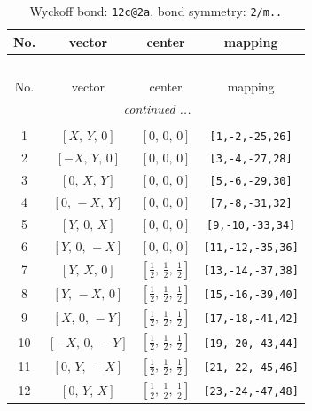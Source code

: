 \documentclass[fleqn,8pt]{jsarticle}
\begin{document}
\begin{longtable}{cccc}
\caption{Wyckoff bond: {\tt 12c@2a}, bond symmetry: {\tt 2/m..}}
 \\
 \hline \hline
No. & vector & center & mapping \\ \hline \endfirsthead

\multicolumn{3}{l}{\tablename\ \thetable{}} \\
 \hline \hline
No. & vector & center & mapping \\ \hline \endhead

 \hline \hline
\multicolumn{3}{r}{\footnotesize\it continued ...} \\ \endfoot

 \hline \hline
\multicolumn{3}{r}{} \\ \endlastfoot

1 & $\left[ X,\, Y,\, 0 \right]$ & $\left[ 0,\, 0,\, 0 \right]$ & {\tt [1,-2,-25,26]} \\ \hline
2 & $\left[ - X,\, Y,\, 0 \right]$ & $\left[ 0,\, 0,\, 0 \right]$ & {\tt [3,-4,-27,28]} \\ \hline
3 & $\left[ 0,\, X,\, Y \right]$ & $\left[ 0,\, 0,\, 0 \right]$ & {\tt [5,-6,-29,30]} \\ \hline
4 & $\left[ 0,\, - X,\, Y \right]$ & $\left[ 0,\, 0,\, 0 \right]$ & {\tt [7,-8,-31,32]} \\ \hline
5 & $\left[ Y,\, 0,\, X \right]$ & $\left[ 0,\, 0,\, 0 \right]$ & {\tt [9,-10,-33,34]} \\ \hline
6 & $\left[ Y,\, 0,\, - X \right]$ & $\left[ 0,\, 0,\, 0 \right]$ & {\tt [11,-12,-35,36]} \\ \hline
7 & $\left[ Y,\, X,\, 0 \right]$ & $\left[ \frac{1}{2},\, \frac{1}{2},\, \frac{1}{2} \right]$ & {\tt [13,-14,-37,38]} \\ \hline
8 & $\left[ Y,\, - X,\, 0 \right]$ & $\left[ \frac{1}{2},\, \frac{1}{2},\, \frac{1}{2} \right]$ & {\tt [15,-16,-39,40]} \\ \hline
9 & $\left[ X,\, 0,\, - Y \right]$ & $\left[ \frac{1}{2},\, \frac{1}{2},\, \frac{1}{2} \right]$ & {\tt [17,-18,-41,42]} \\ \hline
10 & $\left[ - X,\, 0,\, - Y \right]$ & $\left[ \frac{1}{2},\, \frac{1}{2},\, \frac{1}{2} \right]$ & {\tt [19,-20,-43,44]} \\ \hline
11 & $\left[ 0,\, Y,\, - X \right]$ & $\left[ \frac{1}{2},\, \frac{1}{2},\, \frac{1}{2} \right]$ & {\tt [21,-22,-45,46]} \\ \hline
12 & $\left[ 0,\, Y,\, X \right]$ & $\left[ \frac{1}{2},\, \frac{1}{2},\, \frac{1}{2} \right]$ & {\tt [23,-24,-47,48]} \\
\end{longtable}
\end{document}
